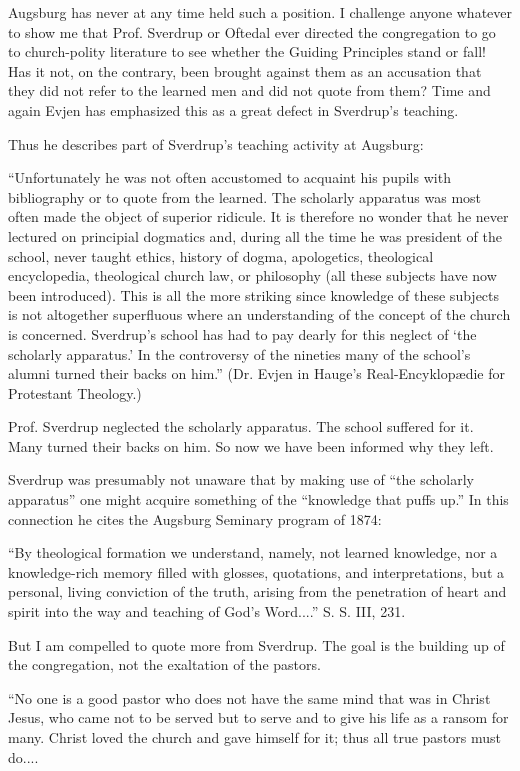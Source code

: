 Augsburg has never at any time held such a position. I challenge anyone whatever to show me that Prof. Sverdrup or Oftedal ever directed the congregation to go to church-polity literature to see whether the Guiding Principles stand or fall! Has it not, on the contrary, been brought against them as an accusation that they did not refer to the learned men and did not quote from them? Time and again Evjen has emphasized this as a great defect in Sverdrup’s teaching.

Thus he describes part of Sverdrup’s teaching activity at Augsburg:

“Unfortunately he was not often accustomed to acquaint his pupils with bibliography or to quote from the learned. The scholarly apparatus was most often made the object of superior ridicule. It is therefore no wonder that he never lectured on principial dogmatics and, during all the time he was president of the school, never taught ethics, history of dogma, apologetics, theological encyclopedia, theological church law, or philosophy (all these subjects have now been introduced). This is all the more striking since knowledge of these subjects is not altogether superfluous where an understanding of the concept of the church is concerned. Sverdrup’s school has had to pay dearly for this neglect of ‘the scholarly apparatus.’ In the controversy of the nineties many of the school’s alumni turned their backs on him.” (Dr. Evjen in Hauge’s Real-Encyklopædie for Protestant Theology.)

Prof. Sverdrup neglected the scholarly apparatus. The school suffered for it. Many turned their backs on him. So now we have been informed why they left.

Sverdrup was presumably not unaware that by making use of “the scholarly apparatus” one might acquire something of the “knowledge that puffs up.” In this connection he cites the Augsburg Seminary program of 1874:

“By theological formation we understand, namely, not learned knowledge, nor a knowledge-rich memory filled with glosses, quotations, and interpretations, but a personal, living conviction of the truth, arising from the penetration of heart and spirit into the way and teaching of God’s Word....” S. S. III, 231.

But I am compelled to quote more from Sverdrup. The goal is the building up of the congregation, not the exaltation of the pastors.

“No one is a good pastor who does not have the same mind that was in Christ Jesus, who came not to be served but to serve and to give his life as a ransom for many. Christ loved the church and gave himself for it; thus all true pastors must do....

